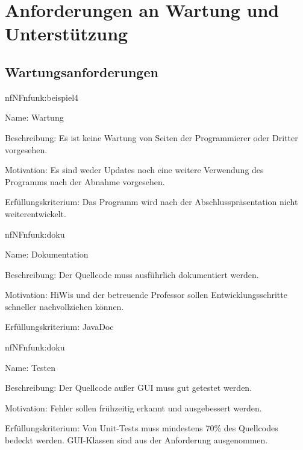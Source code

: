 \section{Anforderungen an Wartung und Unterstützung}

\subsection{Wartungsanforderungen}

\begin{description}[leftmargin=5em, style=sameline]	
	\begin{lhp}{nf}{NF}{nfunk:beispiel4}
		\item [Name:] Wartung
		\item [Beschreibung:] Es ist keine Wartung von Seiten der Programmierer oder Dritter vorgesehen. 
		\item [Motivation:] Es sind weder Updates noch eine weitere Verwendung des Programms nach der Abnahme vorgesehen.
		\item [Erfüllungskriterium:] Das Programm wird nach der Abschlusspräsentation nicht weiterentwickelt.
	\end{lhp}
\end{description}

\begin{description}[leftmargin=5em, style=sameline]	
	\begin{lhp}{nf}{NF}{nfunk:doku}
		\item [Name:] Dokumentation
		\item [Beschreibung:] Der Quellcode muss ausführlich dokumentiert werden.
		\item [Motivation:] HiWis und der betreuende Professor sollen Entwicklungsschritte schneller nachvollziehen können.
		\item [Erfüllungskriterium:] JavaDoc 
	\end{lhp}
\end{description}

\begin{description}[leftmargin=5em, style=sameline]	
	\begin{lhp}{nf}{NF}{nfunk:doku}
		\item [Name:] Testen
		\item [Beschreibung:] Der Quellcode außer GUI muss gut getestet werden.
		\item [Motivation:] Fehler sollen frühzeitig erkannt und ausgebessert werden.
		\item [Erfüllungskriterium:] Von Unit-Tests muss mindestens 70\% des Quellcodes bedeckt werden. GUI-Klassen sind aus der Anforderung ausgenommen.
	\end{lhp}
\end{description}

